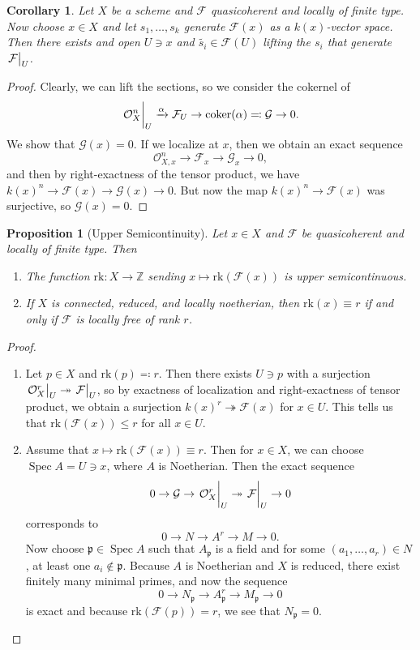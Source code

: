 \documentclass[leqno, openany]{memoir}
\newtheorem{cor}[thm]{Corollary}
\newtheorem{prop}[thm]{Proposition}
\theoremstyle{definition}
\theoremstyle{remark}
\theoremstyle{plain}
\theoremstyle{definition}
\theoremstyle{remark}
\newcommand{\Z}{\mathbb{Z}}
\newcommand{\mc}[1]{\mathcal{#1}}
\newcommand{\mf}[1]{\mathfrak{#1}}
\newcommand{\mr}[1]{\mathrm{#1}}
\newcommand{\wt}[1]{\widetilde{#1}}
\DeclareMathOperator{\Spec}{Spec}
\begin{document}
\begin{cor}
    Let $X$ be a scheme and $\mc{F}$ quasicoherent and locally of finite type. Now choose $x \in X$ and let $s_1, \ldots, s_k$ generate $\mc{F}(x)$ as a $k(x)$-vector space. Then there exists and open $U \ni x$ and $\wt{s_i} \in \mc{F}(U)$ lifting the $s_i$ that generate $\eval{\mc{F}}_U$.
\end{cor}

\begin{proof}
    Clearly, we can lift the sections, so we consider the cokernel of
    \[ \eval{\mc{O}_X^n}_U \xrightarrow{\alpha} \mc{F}_U \to \mr{coker}(\alpha) \eqqcolon \mc{G} \to 0. \]
    We show that $\mc{G}(x) = 0$. If we localize at $x$, then we obtain an exact sequence
    \[ \mc{O}_{X,x}^n \to \mc{F}_x \to \mc{G}_x \to 0, \]
    and then by right-exactness of the tensor product, we have ${k(x)}^n \to \mc{F}(x) \to \mc{G}(x) \to 0$. But now the map ${k(x)}^n \to \mc{F}(x)$ was surjective, so $\mc{G}(x) = 0$.
\end{proof}

\begin{prop}[Upper Semicontinuity]
    Let $x \in X$ and $\mc{F}$ be quasicoherent and locally of finite type. Then
    \begin{enumerate}
        \item The function $\mr{rk} \colon X \to \Z$ sending $x \mapsto \mr{rk}(\mc{F}(x))$ is upper semicontinuous.
        \item If $X$ is connected, reduced, and locally noetherian, then $\mr{rk}(x) \equiv r$ if and only if $\mc{F}$ is locally free of rank $r$.
    \end{enumerate}
\end{prop}

\begin{proof}\leavevmode
    \begin{enumerate}
        \item Let $p \in X$ and $\mr{rk}(p) \eqqcolon r$. Then there exists $U \ni p$ with a surjection $\eval{\mc{O}_X^r}_U \twoheadrightarrow \eval{\mc{F}}_U$, so by exactness of localization and right-exactness of tensor product, we obtain a surjection ${k(x)}^r \twoheadrightarrow \mc{F}(x)$ for $x \in U$. This tells us that $\mr{rk}(\mc{F}(x)) \leq r$ for all $x \in U$.
        \item Assume that $x \mapsto \mr{rk}(\mc{F}(x)) \equiv r$. Then for $x \in X$, we can choose $\Spec A = U \ni x$, where $A$ is Noetherian. Then the exact sequence
            \[ 0 \to \mc{G} \to \eval{\mc{O}_X^r}_U \twoheadrightarrow \eval{\mc{F}}_U \to 0 \]
            corresponds to
            \[ 0 \to N \to A^r \to M \to 0. \]
            Now choose $\mf{p} \in \Spec A$ such that $A_{\mf{p}}$ is a field and for some $(a_1, \ldots, a_r) \in N$, at least one $a_i \notin \mf{p}$. Because $A$ is Noetherian and $X$ is reduced, there exist finitely many minimal primes, and now the sequence
            \[ 0 \to N_{\mf{p}} \to A_{\mf{p}}^r \to M_{\mf{p}} \to 0 \]
            is exact and because $\mr{rk}(\mc{F}(p)) = r$, we see that $N_{\mf{p}} = 0$. \qedhere
    \end{enumerate}
\end{proof}
\end{document}
